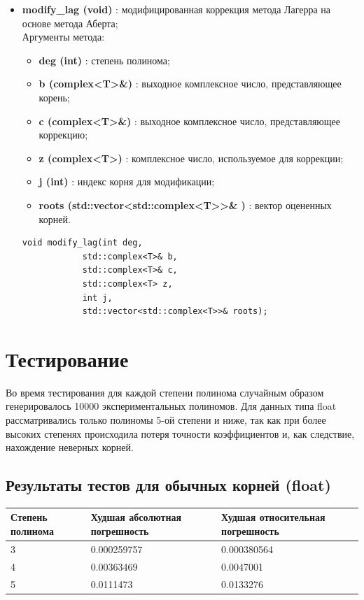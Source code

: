 \documentclass[a4paper,12pt]{article}
\begin{document}
\begin{itemize}
    \item \textbf{modify\_lag (void)} : модифицированная коррекция метода Лагерра на основе метода Аберта;
    \\Аргументы метода:
    \begin{itemize}
        \renewcommand{\labelitemi}{-}
        \item \textbf{deg (int)} : степень полинома;
        \item \textbf{b (complex<T>\&)} : выходное комплексное число, представляющее корень;
        \item \textbf{c (complex<T>\&)} : выходное комплексное число, представляющее коррекцию;
        \item \textbf{z (complex<T>)} : комплексное число, используемое для коррекции;
        \item \textbf{j (int)} : индекс корня для модификации;
        \item \textbf{roots (std::vector<std::complex<T>>\& )} : вектор оцененных корней.
    \end{itemize}
\begin{lstlisting}[language=С++]
void modify_lag(int deg, 
            std::complex<T>& b, 
            std::complex<T>& c, 
            std::complex<T> z, 
            int j, 
            std::vector<std::complex<T>>& roots); \end{lstlisting}
    
\end{itemize}

\newpage
\section{Тестирование}
Во время тестирования для каждой степени полинома случайным образом генерировалось 10000 экспериментальных полиномов. Для данных типа float рассматривались только полиномы 5-ой степени и ниже, так как при более высоких степенях происходила потеря точности коэффициентов и, как следствие, нахождение неверных корней.

\subsection{Результаты тестов для обычных корней (float)}
\begin{center}
  \begin{tabular}{|p{4.5cm}|p{5.5cm}|p{5.5cm}|}
  \hline
  \textbf{Степень полинома}  &  \textbf{Худшая абсолютная погрешность} & \textbf{Худшая относительная погрешность} \\
  \hline
  3 & 0.000259757 & 0.000380564 \\
  \hline
  4 & 0.00363469 & 0.0047001 \\
  \hline
  5 & 0.0111473 & 0.0133276 \\
  \hline
\end{tabular}
\label{tab:my_label_2}
\end{center}
\end{document}
